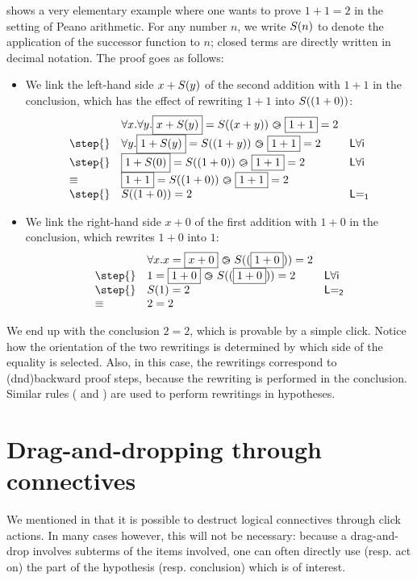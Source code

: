  shows a very elementary example where one wants to prove
$1+1=2$ in the setting of Peano arithmetic. For any number $n$, we write
$S(n)$ to denote the application of the successor function to $n$; closed
terms are directly written in decimal notation. The proof goes as follows:
\begin{itemize}
  \item We link the left-hand side $x + S(y)$ of the second addition  with $1 + 1$ in the conclusion, which has the effect of rewriting $1 + 1$ into $S((1 + 0))$:
    $$
      \begin{array}{lll}
        & \forall x. \forall y. \select{x + \suc{y}} = \suc{(x + y)} \back \select{1 + 1} = 2 & \\
        \step{} & \forall y. \select{1 + \suc{y}} = \suc{(1 + y)} \back \select{1 + 1} = 2 &\mathsf{L\forall i} \\
        \step{} & \select{1 + \suc{0}} = \suc{(1 + 0)} \back \select{1 + 1} = 2 &\mathsf{L\forall i} \\
        \syneq & \select{1 + 1} = \suc{(1 + 0)} \back \select{1 + 1} = 2 & \\
        \step{} & \suc{(1 + 0)} = 2 &\mathsf{L{=}_1}
      \end{array}
    $$
  \item We link the right-hand side $x + 0$ of the first addition  with $1 + 0$ in the conclusion, which rewrites $1 + 0$ into $1$:
    $$
      \begin{array}{lll}
        & \forall x. x = \select{x + 0} \back \suc{(\select{1 + 0})} = 2 & \\
        \step{} & 1 = \select{1 + 0} \back \suc{(\select{1 + 0})} = 2 &\mathsf{L\forall i} \\
        \step{} & \suc{1} = 2 &\mathsf{L{=}_2} \\
        \syneq & 2 = 2 &
      \end{array}
    $$
\end{itemize}

We end up with the conclusion $2 = 2$, which is provable by a simple click.
Notice how the orientation of the two rewritings is determined by which side of
the equality is selected. Also, in this case, the rewritings
correspond to \kl(dnd){backward} proof steps, because the rewriting is performed
in the conclusion. Similar rules ( and ) are
used to perform rewritings in hypotheses.


\section{Drag-and-dropping through connectives}
We mentioned in  that it is possible to destruct logical
connectives through click actions. In many cases however, this will not be
necessary: because a drag-and-drop involves subterms of the items involved, one
can often directly use (resp. act on) the part of the hypothesis (resp.
conclusion) which is of interest.

